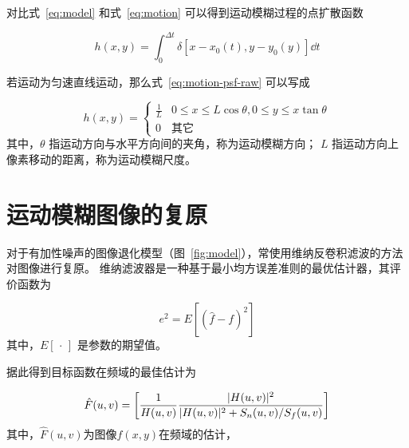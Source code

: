 \documentclass{hitgsrep}
\begin{document}
对比式~\eqref{eq:model} 和式~\eqref{eq:motion} 可以得到运动模糊过程的点扩散函数

\begin{equation}\label{eq:motion-psf-raw}
    h(x,y)=\int_0^{\Delta t}\delta[x-x_0(t),y-y_0(y)]\dd{t}
\end{equation}

若运动为匀速直线运动，那么式~\eqref{eq:motion-psf-raw} 可以写成

\begin{equation}\label{eq:motion:psf}
    h(x,y)=\begin{cases}
        \frac{1}{L} & 0\le x\le L\cos\theta, 0\le y\le x\tan\theta\\
        0 & \text{其它}
    \end{cases}
\end{equation}
其中，$\theta$ 指运动方向与水平方向间的夹角，称为运动模糊方向；
$L$ 指运动方向上像素移动的距离，称为运动模糊尺度。

\section{运动模糊图像的复原}

对于有加性噪声的图像退化模型（图~\ref{fig:model}），常使用维纳反卷积滤波的方法对图像进行复原。
维纳滤波器是一种基于最小均方误差准则的最优估计器，其评价函数为

\begin{equation}
    e^2=E[(\hat{f}-f)^2]
\end{equation}
其中，$E[\,\cdot\,]$ 是参数的期望值。

据此得到目标函数在频域的最佳估计为

\begin{equation}\label{eq:wiener}
    \hat{F}(u,v)=\qty[\frac{1}{H(u,v)}\frac{|H(u,v)|^2}{|H(u,v)|^2+S_n(u,v)/S_f(u,v)}]
\end{equation}
其中，$\hat{F}(u,v)$为图像$f(x,y)$在频域的估计，
\end{document}
